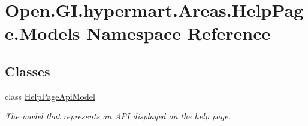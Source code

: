\hypertarget{namespace_open_1_1_g_i_1_1hypermart_1_1_areas_1_1_help_page_1_1_models}{}\section{Open.\+G\+I.\+hypermart.\+Areas.\+Help\+Page.\+Models Namespace Reference}
\label{namespace_open_1_1_g_i_1_1hypermart_1_1_areas_1_1_help_page_1_1_models}
\subsection*{Classes}
\begin{DoxyCompactItemize}
\item 
class \hyperlink{class_open_1_1_g_i_1_1hypermart_1_1_areas_1_1_help_page_1_1_models_1_1_help_page_api_model}{Help\+Page\+Api\+Model}
\begin{DoxyCompactList}\small\item\em The model that represents an A\+P\+I displayed on the help page. \end{DoxyCompactList}\end{DoxyCompactItemize}
